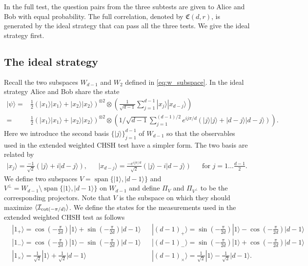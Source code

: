\documentclass[11pt,letterpaper]{article}
\newcommand{\ket}[1]{|#1\rangle}
\newcommand{\x}{\otimes}
\DeclarePairedDelimiter{\ip}{\langle}{\rangle}
\DeclareMathOperator{\spn}{span}
\newcommand{\1}{\mathbb{1}}
\newcommand{\fC}{\mathfrak{C}}
\newcommand{\I}{\mathcal{I}}
\theoremstyle{definition}
\begin{document}
In the full test, the question pairs from the three subtests are given to Alice and Bob with equal probability.
The full correlation, denoted by $\fC(d,r)$, is generated by the ideal strategy that can pass all the three tests. We give the ideal strategy first.
\subsection{The ideal strategy}
Recall the two subspaces $W_{d-1}$ and $W_2$ defined in \cref{eq:w_subspace}. 
In the ideal strategy Alice and Bob share the state 
\begin{align*}
\ket{\psi} = &\frac{1}{2} (\ket{x_1}\ket{x_1} + \ket{x_2}\ket{x_2})^{\x 2} \x \left(\frac{1}{\sqrt{d-1}} \sum_{j=1}^{d-1} \ket{x_j}\ket{x_{d-j}}\right)\\
=&\frac{1}{2} (\ket{x_1}\ket{x_1} + \ket{x_2}\ket{x_2})^{\x 2} \x \left(1/\sqrt{d-1} \sum_{j=1}^{(d-1)/2} e^{ij\pi/d}(\ket{j}\ket{j} + \ket{d-j}\ket{d-j})\right).
\end{align*}
Here we introduce the second basis $\{ \ket{j} \}_{j=1}^{d-1}$ of $W_{d-1}$ so that
the observables used in the extended weighted CHSH test have a simpler form.
The two basis are related by
\begin{align*}
	\ket{x_j} = \frac{-1}{\sqrt{2}}(\ket{j} + i\ket{d-j}), &&
	\ket{x_{d-j}} = \frac{-e^{ij\pi/d}}{\sqrt{2}}(\ket{j} - i\ket{d-j}) && \text{for } j = 1 \dots \frac{d-1}{2}.
\end{align*}
We define two subspaces $V = \spn\{\ket{1}, \ket{d-1}\}$ and $V^\perp = W_{d-1} \setminus\spn\{\ket{1}, \ket{d-1}\}$ on
$W_{d-1}$ and
define $\Pi_V$ and $\Pi_{V^\perp}$ to be the corresponding projectors. Note that $V$ is the subspace on which they should maximize $\ip{\I_{\cot(-\pi/d)}}$.
We define the states for the measurements used in the extended weighted CHSH test as follows
\begin{align*}
	&\ket{1_+} = \cos(-\frac{\pi}{2d})\ket{1} + \sin(-\frac{\pi}{2d})\ket{d-1}
	&&\ket{(d-1)_+} = \sin(-\frac{\pi}{2d})\ket{1} - \cos(-\frac{\pi}{2d})\ket{d-1}\\
	&\ket{1_-} = \cos(-\frac{\pi}{2d})\ket{1} - \sin(-\frac{\pi}{2d})\ket{d-1}
	&&\ket{(d-1)_-} = \sin(-\frac{\pi}{2d})\ket{1} + \cos(-\frac{\pi}{2d})\ket{d-1}\\
	&\ket{1_{\times}} = \frac{1}{\sqrt{2}}\ket{1} + \frac{1}{\sqrt{2}}\ket{d-1}
	&&\ket{(d-1)_{\times}} = \frac{1}{\sqrt{2}}\ket{1} - \frac{1}{\sqrt{2}}\ket{d-1}.
\end{align*}
\end{document}
